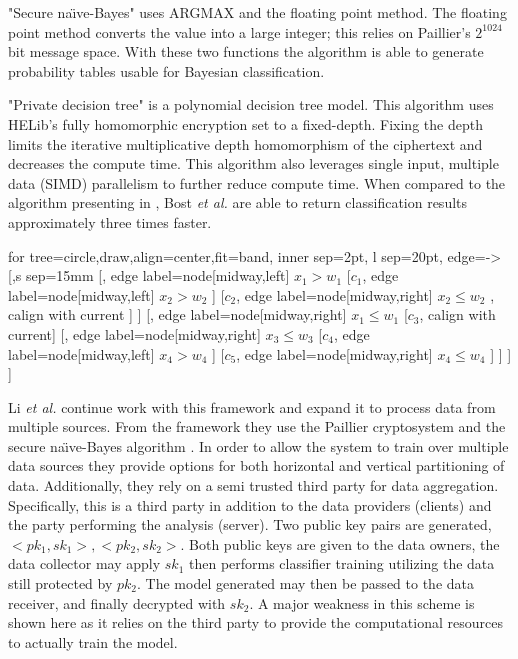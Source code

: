 \documentclass[]{article}
\begin{document}
"Secure na\"{\i}ve-Bayes" uses ARGMAX and the floating point method.
The floating point method converts the value into a large integer; 
this relies on Paillier's $2^{1024}$ bit message space.
With these two functions the algorithm is able to generate probability tables usable for Bayesian classification.

"Private decision tree" is a polynomial decision tree model.
This algorithm uses HELib's fully homomorphic encryption set to a fixed-depth.
Fixing the depth limits the iterative multiplicative depth homomorphism of the ciphertext and decreases the compute time.
This algorithm also leverages single input, multiple data (SIMD) parallelism to further reduce compute time. 	
When compared to the algorithm presenting in \cite{Barni2009}, 
Bost \emph{et al.} are able to return classification results approximately three times faster.

\begingroup
\begin{framed}	
	\centering
	\begin{forest}
for tree={circle,draw,align=center,fit=band, inner sep=2pt, l sep=20pt, edge={->}}
[,s sep=15mm
	[, edge label={node[midway,left] {$x_1 > w_1$}}
		[$c_1$, edge label={node[midway,left] {$x_2 > w_2$ }} ]  
		[$c_2$, edge label={node[midway,right] {$x_2 \leq w_2$ }}, calign with current ] 
	]
	[, edge label={node[midway,right] {$x_1 \leq w_1$}} 
		[$c_3$, calign with current] 
		[, edge label={node[midway,right] {$x_3 \leq w_3$}}
			[$c_4$, edge label={node[midway,left] {$x_4 > w_4$}} ] 
			[$c_5$, edge label={node[midway,right] {$x_4 \leq w_4$}} ]  
		] 
	] 
]		
	\end{forest}
\end{framed}
\vspace{-1.25em}
\vspace{1.5em}
\endgroup

Li \emph{et al.} \cite{Li2018} continue work with this framework and expand it to process data from multiple sources.
From the framework they use the Paillier cryptosystem \cite{Paillier1999} and the secure na\"{\i}ve-Bayes algorithm \cite{Bost2015}.
In order to allow the system to train over multiple data sources they provide options for both horizontal and vertical partitioning of data.
Additionally, they rely on a semi trusted third party for data aggregation. 
Specifically, this is a third party in addition to the data providers (clients) and the party performing the analysis (server).
Two public key pairs are generated, $<pk_1, sk_1>,<pk_2, sk_2>$. 
Both public keys are given to the data owners, the data collector may apply $sk_1$ then performs classifier training utilizing the data still protected by $pk_2$.
The model generated may then be passed to the data receiver, and finally decrypted with $sk_2$.	
A major weakness in this scheme is shown here as it relies on the third party to provide the computational resources to actually train the model.
\end{document}
